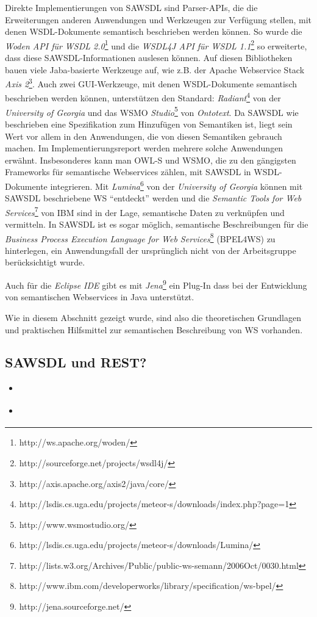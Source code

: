 Direkte Implementierungen von \ac{SAWSDL} sind Parser-\ac{API}s, die die Erweiterungen anderen Anwendungen und Werkzeugen zur Verfügung stellen, mit denen \ac{WSDL}-Dokumente semantisch beschrieben werden können. So wurde die \emph{Woden API für WSDL 2.0}\footnote{http://ws.apache.org/woden/} und die \emph{WSDL4J API für WSDL
1.1}\footnote{http://sourceforge.net/projects/wsdl4j/} so erweiterte, dass diese \ac{SAWSDL}-Informationen auslesen können. Auf diesen Bibliotheken bauen viele Jaba-basierte Werkzeuge auf, wie z.B. der Apache Webservice Stack \emph{Axis 2}\footnote{http://axis.apache.org/axis2/java/core/}. Auch zwei GUI-Werkzeuge, mit denen \ac{WSDL}-Dokumente semantisch beschrieben werden können, unterstützen den Standard: \emph{Radiant}\footnote{http://lsdis.cs.uga.edu/projects/meteor-s/downloads/index.php?page=1} von der \emph{University of Georgia} und das \acl{WSMO} \emph{Studio}\footnote{http://www.wsmostudio.org/} von \emph{Ontotext}. Da \ac{SAWSDL} wie beschrieben eine Spezifikation zum Hinzufügen von Semantiken ist, liegt sein Wert vor allem in den Anwendungen, die von diesen Semantiken gebrauch machen. Im Implementierungsreport werden mehrere solche Anwendungen erwähnt.
Insbesonderes kann man \ac{OWL-S} und \ac{WSMO}, die zu den gängigsten Frameworks für semantische Webservices zählen,  mit \ac{SAWSDL} in \ac{WSDL}-Dokumente integrieren. Mit \emph{Lumina}\footnote{http://lsdis.cs.uga.edu/projects/meteor-s/downloads/Lumina/} von der \emph{University of Georgia} können mit \ac{SAWSDL} beschriebene \acl{WS} "`entdeckt"' werden und die \emph{Semantic Tools for Web Services}\footnote{http://lists.w3.org/Archives/Public/public-ws-semann/2006Oct/0030.html} von IBM sind in der Lage, semantische Daten zu verknüpfen und vermitteln.
In \ac{SAWSDL} ist es sogar möglich, semantische Beschreibungen für die \emph{Business Process Execution Language for Web Services}\footnote{http://www.ibm.com/developerworks/library/specification/ws-bpel/} (BPEL4WS) zu hinterlegen, ein Anwendungsfall der ursprünglich nicht von der Arbeitsgruppe berücksichtigt wurde. \cite[S.63]{ky-sawsdl}

Auch für die \emph{Eclipse IDE} gibt es mit \emph{Jena}\footnote{http://jena.sourceforge.net/} ein Plug-In dass bei der Entwicklung von semantischen Webservices in Java unterstützt.

Wie in diesem Abschnitt gezeigt wurde, sind also die theoretischen Grundlagen und praktischen Hilfsmittel zur semantischen Beschreibung von \acl{WS} vorhanden.


\subsection{\ac{SAWSDL} und \ac{REST}?}

\begin{itemize}
\item \cite{ma-sawslrest}
\item \cite{xn-sss}
\end{itemize}